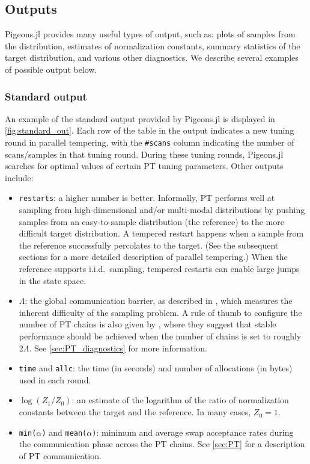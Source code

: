 \subsection{Outputs}
Pigeons.jl provides many useful types of output, such as: plots of samples from 
the distribution, estimates of normalization constants, summary statistics of 
the target distribution, and various other diagnostics. 
We describe several examples of possible output below.


\subsubsection{Standard output}
An example of the standard output provided by Pigeons.jl is displayed in \cref{fig:standard_out}. 
Each row of the table in the output indicates a new tuning round in parallel tempering, 
with the \texttt{\#scans} column indicating the number of scans/samples in 
that tuning round. 
During these tuning rounds, Pigeons.jl searches for optimal values of certain PT 
tuning parameters. Other outputs include: 
\begin{itemize}
    \item \texttt{restarts}: a higher number is better. 
    Informally, PT performs well at sampling from high-dimensional and/or multi-modal 
    distributions by pushing samples from an easy-to-sample distribution (the reference) 
    to the more difficult target distribution. 
    A tempered restart happens when a sample from the reference successfully 
    percolates to the target. (See the subsequent sections for a more detailed description 
    of parallel tempering.) 
    When the reference supports i.i.d.~sampling, tempered restarts 
    can enable large jumps in the state space. 

    \item \texttt{$\Lambda$}: the global communication barrier, as described in \cite{syed2021nrpt}, 
    which measures the inherent difficulty of the sampling problem.
    A rule of thumb to configure the number of PT chains is also 
    given by \cite{syed2021nrpt}, where they suggest that stable performance 
    should be achieved when the number of chains is set to roughly 2$\Lambda$.
    See \cref{sec:PT_diagnostics} for more information.

    \item \texttt{time} and \texttt{allc}: the time (in seconds) and number of 
    allocations (in bytes) used in each round.

    \item \texttt{$\log(Z_1/Z_0)$}: an estimate of the 
    logarithm of the ratio of normalization constants between the target and the reference. 
    In many cases, $Z_0 = 1$.

    \item \texttt{min($\alpha$)} and \texttt{mean($\alpha$)}: minimum and average swap 
    acceptance rates during the communication phase across the PT chains.
    See \cref{sec:PT} for a description of PT communication.
\end{itemize}


